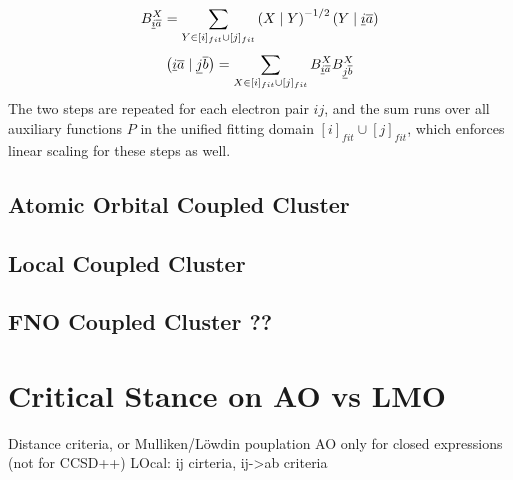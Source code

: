 \begin{equation}
B^{X}_{\underline{i}\overline{a}} = \sum_{Y \in [i]_{fit} \cup [j]_{fit}} \left( X \mid Y \right)^{-1/2} \left( Y \mid \underline{i}\overline{a} \right)
\end{equation}
\begin{equation}
\left( \underline{i}\overline{a} \mid \underline{j}\overline{b} \right) = \sum_{X \in [i]_{fit} \cup [j]_{fit}} B^{X}_{\underline{i}\overline{a}} B^{X}_{\underline{j}\overline{b}} 
\end{equation}
\noindent The two steps are repeated for each electron pair $ij$, and the sum runs over all auxiliary functions $P$ in the unified fitting domain $[i]_{fit} \cup [j]_{fit}$, which enforces linear scaling for these steps as well. 


\subsection{Atomic Orbital Coupled Cluster}

\subsection{Local Coupled Cluster}

\subsection{FNO Coupled Cluster ??}

\section{Critical Stance on AO vs LMO} 

Distance criteria, or Mulliken/Löwdin pouplation
AO only for closed expressions (not for CCSD++) 
LOcal: ij cirteria, ij->ab criteria %




